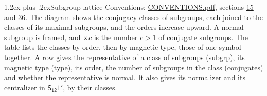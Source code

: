 \documentclass[10pt,a4paper]{article}
\makeatletter
\renewcommand\section{\@startsection{section}{1}{\z@}{-3ex plus -1ex minus -.2ex}%
  {1.2ex plus .2ex}{\normalfont\large\sffamily\bfseries\color{parttitle}}}
\numberwithin{equation}{section}
\newcommand{\grp}[1]{\mathsf{#1}}
\makeatother
\begin{document}
\section{Subgroup lattice}\label{s:subgroups}
Conventions: \href{../../CONVENTIONS.pdf}{CONVENTIONS.pdf}, sections \href{../../../rotation/CONVENTIONS.pdf\#conv.15}{15} and \href{../../CONVENTIONS.pdf\#conv.36}{36}.
The diagram shows the conjugacy classes of subgroups, each joined to the classes of its maximal subgroups, and the orders increase upward. \label{n:index.conjugates.c}A normal subgroup is framed, and ${\times}c$ is the number $c > 1$ of conjugate subgroups. The table lists the classes by order, then by magnetic type, those of one symbol together. \label{n:head.subgroup}\label{n:head.magnetic.type}\label{n:head.order}\label{n:head.conjugates}\label{n:head.normal}A row gives the representative of a class of subgroups (subgrp), its magnetic type (type), its order, the number of subgroups in the class (conjugates) and whether the representative is normal. \label{n:head.normalizer}\label{n:head.centralizer}It also gives its normalizer and its centralizer in $\grp{S_{12}1'}$, by their classes. 
\end{document}
